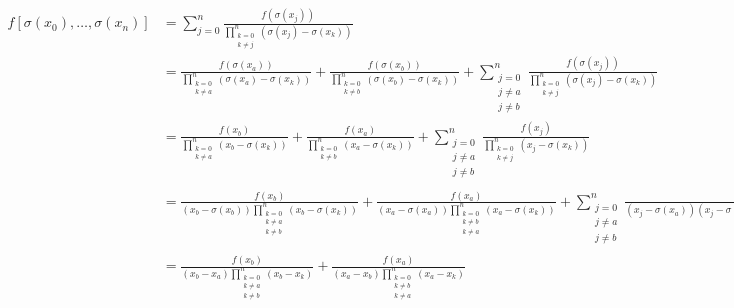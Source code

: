 \documentclass[12pt]{article}
\begin{document}
\begin{align*}
    f[\sigma(x_0),\dots,\sigma(x_n)]
    &= \sum_{j=0}^n \frac{f(\sigma(x_j))}{\displaystyle\prod_{\substack{k=0 \\ k\ne j}}^n (\sigma(x_j)-\sigma(x_k))} \\
    &= \frac{f(\sigma(x_a))}{\displaystyle\prod_{\substack{k=0 \\ k\ne a}}^n (\sigma(x_a)-\sigma(x_k))}
        + \frac{f(\sigma(x_b))}{\displaystyle\prod_{\substack{k=0 \\ k\ne b}}^n (\sigma(x_b)-\sigma(x_k))}
        +\sum_{\substack{j=0 \\ j\ne a \\ j\ne b}}^n \frac{f(\sigma(x_j))}{\displaystyle\prod_{\substack{k=0 \\ k\ne j}}^n (\sigma(x_j)-\sigma(x_k))} \\
    &= \frac{f(x_b)}{\displaystyle\prod_{\substack{k=0 \\ k\ne a}}^n (x_b-\sigma(x_k))}
        + \frac{f(x_a)}{\displaystyle\prod_{\substack{k=0 \\ k\ne b}}^n (x_a-\sigma(x_k))}
        +\sum_{\substack{j=0 \\ j\ne a \\ j\ne b}}^n \frac{f(x_j)}{\displaystyle\prod_{\substack{k=0 \\ k\ne j}}^n (x_j-\sigma(x_k))} \\
    &= \frac{f(x_b)}{(x_b-\sigma(x_b))\displaystyle\prod_{\substack{k=0 \\ k\ne a \\ k\ne b}}^n (x_b-\sigma(x_k))}
        + \frac{f(x_a)}{(x_a - \sigma(x_a))\displaystyle\prod_{\substack{k=0 \\ k\ne b \\ k\ne a}}^n (x_a-\sigma(x_k))}
        +\sum_{\substack{j=0 \\ j\ne a \\ j\ne b}}^n \frac{f(x_j)}{(x_j-\sigma(x_a))(x_j-\sigma(x_b))\displaystyle\prod_{\substack{k=0 \\ k\ne j \\ k\ne a \\ k\ne b}}^n (x_j-\sigma(x_k))} \\
    &= \frac{f(x_b)}{(x_b-x_a)\displaystyle\prod_{\substack{k=0 \\ k\ne a \\ k\ne b}}^n (x_b-x_k)}
        + \frac{f(x_a)}{(x_a - x_b)\displaystyle\prod_{\substack{k=0 \\ k\ne b \\ k\ne a}}^n (x_a-x_k)}

\end{align*}
\end{document}
